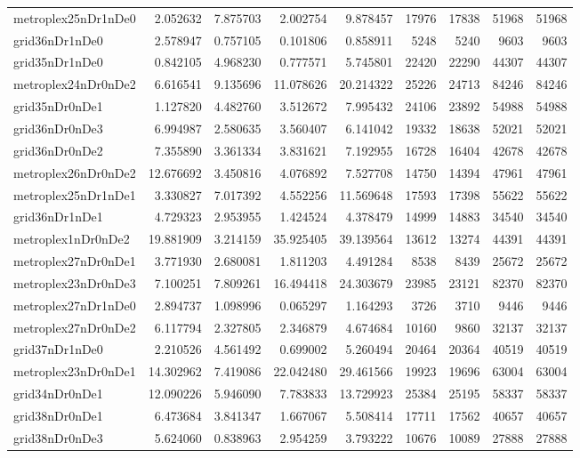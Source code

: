 \begin{longtable}{|l|r|r|r|r|r|r|r|r|}
metroplex25nDr1nDe0 & 2.052632 & 7.875703 & 2.002754 & 9.878457 & 17976 & 17838 & 51968 & 51968 \\
grid36nDr1nDe0 & 2.578947 & 0.757105 & 0.101806 & 0.858911 & 5248 & 5240 & 9603 & 9603 \\
grid35nDr1nDe0 & 0.842105 & 4.968230 & 0.777571 & 5.745801 & 22420 & 22290 & 44307 & 44307 \\
metroplex24nDr0nDe2 & 6.616541 & 9.135696 & 11.078626 & 20.214322 & 25226 & 24713 & 84246 & 84246 \\
grid35nDr0nDe1 & 1.127820 & 4.482760 & 3.512672 & 7.995432 & 24106 & 23892 & 54988 & 54988 \\
grid36nDr0nDe3 & 6.994987 & 2.580635 & 3.560407 & 6.141042 & 19332 & 18638 & 52021 & 52021 \\
grid36nDr0nDe2 & 7.355890 & 3.361334 & 3.831621 & 7.192955 & 16728 & 16404 & 42678 & 42678 \\
metroplex26nDr0nDe2 & 12.676692 & 3.450816 & 4.076892 & 7.527708 & 14750 & 14394 & 47961 & 47961 \\
metroplex25nDr1nDe1 & 3.330827 & 7.017392 & 4.552256 & 11.569648 & 17593 & 17398 & 55622 & 55622 \\
grid36nDr1nDe1 & 4.729323 & 2.953955 & 1.424524 & 4.378479 & 14999 & 14883 & 34540 & 34540 \\
metroplex1nDr0nDe2 & 19.881909 & 3.214159 & 35.925405 & 39.139564 & 13612 & 13274 & 44391 & 44391 \\
metroplex27nDr0nDe1 & 3.771930 & 2.680081 & 1.811203 & 4.491284 & 8538 & 8439 & 25672 & 25672 \\
metroplex23nDr0nDe3 & 7.100251 & 7.809261 & 16.494418 & 24.303679 & 23985 & 23121 & 82370 & 82370 \\
metroplex27nDr1nDe0 & 2.894737 & 1.098996 & 0.065297 & 1.164293 & 3726 & 3710 & 9446 & 9446 \\
metroplex27nDr0nDe2 & 6.117794 & 2.327805 & 2.346879 & 4.674684 & 10160 & 9860 & 32137 & 32137 \\
grid37nDr1nDe0 & 2.210526 & 4.561492 & 0.699002 & 5.260494 & 20464 & 20364 & 40519 & 40519 \\
metroplex23nDr0nDe1 & 14.302962 & 7.419086 & 22.042480 & 29.461566 & 19923 & 19696 & 63004 & 63004 \\
grid34nDr0nDe1 & 12.090226 & 5.946090 & 7.783833 & 13.729923 & 25384 & 25195 & 58337 & 58337 \\
grid38nDr0nDe1 & 6.473684 & 3.841347 & 1.667067 & 5.508414 & 17711 & 17562 & 40657 & 40657 \\
grid38nDr0nDe3 & 5.624060 & 0.838963 & 2.954259 & 3.793222 & 10676 & 10089 & 27888 & 27888 \\

\end{longtable}
